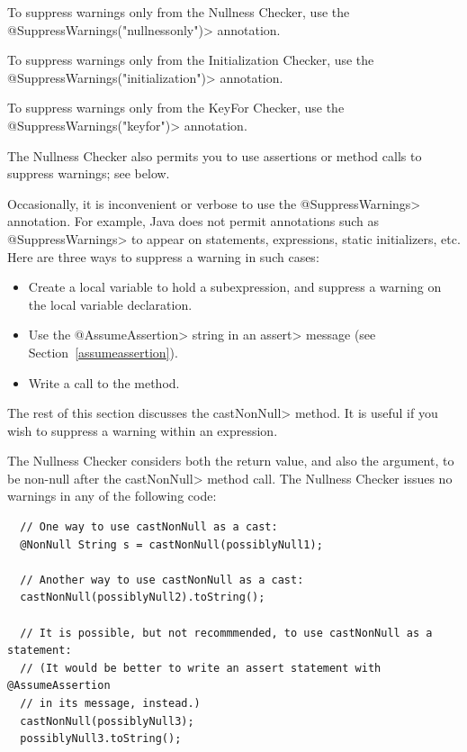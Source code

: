 To suppress warnings only from the Nullness Checker, use the \<@SuppressWarnings("nullnessonly")> annotation.

To suppress warnings only from the Initialization Checker, use the \<@SuppressWarnings("initialization")> annotation.

To suppress warnings only from the KeyFor Checker, use the \<@SuppressWarnings("keyfor")> annotation.

The Nullness Checker also permits you to use assertions or method calls to
suppress warnings; see below.


Occasionally, it is inconvenient or
verbose to use the \<@SuppressWarnings> annotation.  For example, Java does
not permit annotations such as \<@SuppressWarnings> to appear on
statements, expressions, static initializers, etc.
Here are three ways to suppress a warning in such cases:
\begin{itemize}
\item
  Create a local variable to hold a subexpression, and
  suppress a warning on the local variable declaration.
\item
  Use the \<@AssumeAssertion> string in
  an \<assert> message (see Section~\ref{assumeassertion}).
\item
  Write a call to the
   method.
\end{itemize}

The rest of this section discusses the \<castNonNull> method.
It is useful if you wish to suppress a warning within an expression.

The Nullness Checker considers both the return value, and also the
argument, to be non-null after the \<castNonNull> method call.
The Nullness Checker issues no warnings in any of the following
code:

\begin{Verbatim}
  // One way to use castNonNull as a cast:
  @NonNull String s = castNonNull(possiblyNull1);

  // Another way to use castNonNull as a cast:
  castNonNull(possiblyNull2).toString();

  // It is possible, but not recommmended, to use castNonNull as a statement:
  // (It would be better to write an assert statement with @AssumeAssertion
  // in its message, instead.)
  castNonNull(possiblyNull3);
  possiblyNull3.toString();
\end{Verbatim}


